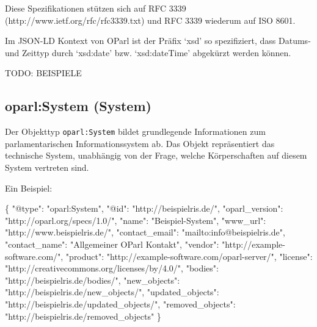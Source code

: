 \documentclass[,a4paper]{article}
\newenvironment{Shaded}{}{}
\newcommand{\DataTypeTok}[1]{\textcolor[rgb]{0.56,0.13,0.00}{{#1}}}
\newcommand{\StringTok}[1]{\textcolor[rgb]{0.25,0.44,0.63}{{#1}}}
\newcommand{\NormalTok}[1]{{#1}}
\begin{document}
Diese Spezifikationen stützen sich auf RFC 3339
(http://www.ietf.org/rfc/rfc3339.txt) und RFC 3339 wiederum auf ISO
8601.

Im JSON-LD Kontext von OParl ist der Präfix `xsd' so spezifiziert, dass
Datums- und Zeittyp durch `xsd:date' bzw. `xsd:dateTime' abgekürzt
werden können.

TODO: BEISPIELE

\subsection{oparl:System (System)}\label{oparlux5fsystem}

Der Objekttyp \texttt{oparl:System} bildet grundlegende Informationen
zum parlamentarischen Informationssystem ab. Das Objekt repräsentiert
das technische System, unabhängig von der Frage, welche Körperschaften
auf diesem System vertreten sind.

Ein Beispiel:

\begin{Shaded}
\begin{Highlighting}[]
\NormalTok{\{}
    \DataTypeTok{"@type"}\NormalTok{: }\StringTok{"oparl:System"}\NormalTok{,}
    \DataTypeTok{"@id"}\NormalTok{: }\StringTok{"http://beispielris.de/"}\NormalTok{,}
    \DataTypeTok{"oparl_version"}\NormalTok{: }\StringTok{"http://oparl.org/specs/1.0/"}\NormalTok{,}
    \DataTypeTok{"name"}\NormalTok{: }\StringTok{"Beispiel-System"}\NormalTok{,}
    \DataTypeTok{"www_url"}\NormalTok{: }\StringTok{"http://www.beispielris.de/"}\NormalTok{,}
    \DataTypeTok{"contact_email"}\NormalTok{: }\StringTok{"mailto:info@beispielris.de"}\NormalTok{,}
    \DataTypeTok{"contact_name"}\NormalTok{: }\StringTok{"Allgemeiner OParl Kontakt"}\NormalTok{,}
    \DataTypeTok{"vendor"}\NormalTok{: }\StringTok{"http://example-software.com/"}\NormalTok{,}
    \DataTypeTok{"product"}\NormalTok{: }\StringTok{"http://example-software.com/oparl-server/"}\NormalTok{,}
    \DataTypeTok{"license"}\NormalTok{: }\StringTok{"http://creativecommons.org/licenses/by/4.0/"}\NormalTok{,}
    \DataTypeTok{"bodies"}\NormalTok{: }\StringTok{"http://beispielris.de/bodies/"}\NormalTok{,}
    \DataTypeTok{"new_objects"}\NormalTok{: }\StringTok{"http://beispielris.de/new_objects/"}\NormalTok{,}
    \DataTypeTok{"updated_objects"}\NormalTok{: }\StringTok{"http://beispielris.de/updated_objects/"}\NormalTok{,}
    \DataTypeTok{"removed_objects"}\NormalTok{: }\StringTok{"http://beispielris.de/removed_objects"}
\NormalTok{\}}
\end{Highlighting}
\end{Shaded}
\end{document}
